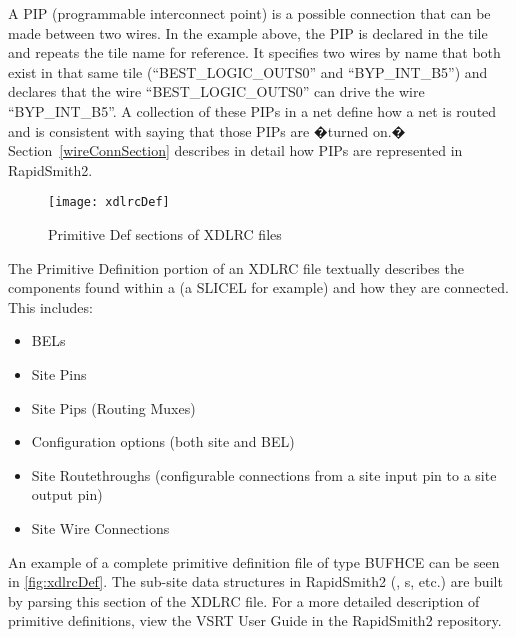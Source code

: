 \noindent
A PIP (programmable interconnect point) is a possible connection that can be
made between two wires. In the example above, the PIP is declared in the tile
and repeats the tile name for reference. It specifies two wires by name that
both exist in that same tile (``BEST\_LOGIC\_OUTS0'' and ``BYP\_INT\_B5'') and
declares that the wire ``BEST\_LOGIC\_OUTS0'' can drive the wire
``BYP\-\_INT\_B5''. A collection of these PIPs in a net define how a net is
routed and is consistent with saying that those PIPs are �turned on.�
Section~\ref{wireConnSection} describes in detail how PIPs are represented in
RapidSmith2.

\bigbreak \noindent
\begin{large}
\end{large}

\bigbreak \noindent
\begin{figure}[b!]
	\centering
	\texttt{[image: xdlrcDef]}
	\caption{Primitive Def sections of XDLRC files}
	\label{fig:xdlrcDef}
\end{figure}

The Primitive Definition portion of an XDLRC file textually describes the
components found within a   (a SLICEL for example)
and how they are connected. This includes: 

\begin{itemize}
  \item BELs
  \item Site Pins 
  \item Site Pips (Routing Muxes) 
  \item Configuration options (both site and BEL)
  \item Site Routethroughs (configurable connections from a site input pin to
  a site output pin)
  \item Site Wire Connections
\end{itemize}

\noindent An example of a complete primitive definition file of type BUFHCE can
be seen in \autoref{fig:xdlrcDef}. The sub-site data structures in RapidSmith2
(, s, etc.) are built by parsing this section of the
XDLRC file. For a more detailed description of primitive definitions, view the
VSRT User Guide in the RapidSmith2 repository.


